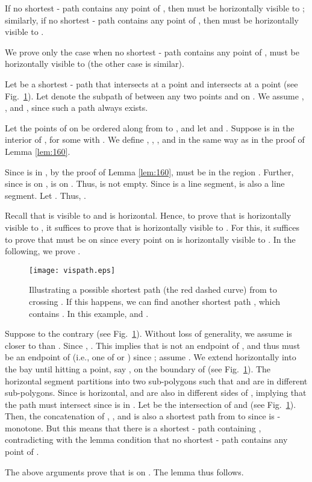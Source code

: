 \documentclass[english,runningheads,11pt]{llncs}
\newenvironment{proof}{\noindent {\textbf{Proof:}}\rm}{\hfill \rm}
\begin{document}
\begin{lemma}\label{lem:190}
If no shortest - path contains any point of
, then
 must be horizontally visible to ;
similarly, if no shortest - path contains any
point of , then  must be horizontally visible
to .
\end{lemma}
\begin{proof}
We prove only the case when no shortest -
path contains any point of ,
 must be horizontally visible to 
(the other case is similar).


Let  be a shortest - path that intersects
 at a point  and intersects  at a point  (see
Fig.~\ref{fig:vispath}).  Let  denote
the subpath of  between any two points  and  on . We assume
, , and
, since such a path  always exists.

Let the points of  on  be
 ordered along  from  to
, and let  and .
Suppose  is in the interior of
, for some  with .
We define , , , and  in the same way
as in the proof of Lemma \ref{lem:160}.

Since  is in , by the proof of Lemma \ref{lem:160}, 
must be in the region . Further, since  is on ,  is on . Thus,
 is not empty. Since  is a line segment,
 is also a line segment.
Let .
Thus, .

Recall that  is visible to  and
 is horizontal. Hence, to prove that
 is horizontally visible to , it
suffices to prove that  is horizontally visible to
. For this, it suffices to prove that  must
be on  since every point on
 is horizontally visible to
. In the following, we prove .


\begin{figure}[t]
\begin{minipage}[t]{\linewidth}
\begin{center}
\texttt{[image: vispath.eps]}
\caption{\footnotesize Illustrating a possible shortest path (the red dashed curve) from
 to  crossing . If this happens, we can
find another shortest path , which contains . In this example, 
and .}
\label{fig:vispath}
\end{center}
\end{minipage}
\vspace*{-0.15in}
\end{figure}

Suppose to the contrary  (see
Fig.~\ref{fig:vispath}).
Without loss of generality, we assume  is closer to 
than . Since , .
This implies that  is not an endpoint of , and thus
 must be an endpoint of  (i.e., one of
 or ) since
; assume .
We extend  horizontally into the bay  until
hitting a point, say , on the boundary of  (see
Fig.~\ref{fig:vispath}). The horizontal segment
 partitions  into two sub-polygons such that  and
 are in different sub-polygons. Since  is
horizontal,  and  are also in different sides of
, implying
that the path  must intersect
 since  is in .
Let  be the intersection of  and  (see
Fig.~\ref{fig:vispath}).
Then, the concatenation of  , ,
and  is also a shortest path from  to  since
 is -monotone.
But this means that there is a shortest
- path containing , contradicting
with the lemma condition that no shortest - path contains any point of
.

The above arguments prove that  is on .
The lemma thus follows.
\end{proof}
\end{document}
